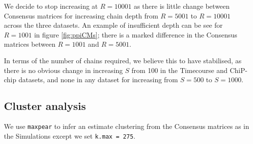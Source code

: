 \documentclass[]{article}
\begin{document}

We decide to stop increasing at $R=10001$ as there is little change between Consensus matrices for increasing chain depth from $R=5001$ to $R=10001$ across the three datasets. An example of insufficient depth can be see for $R=1001$ in figure \ref{fig:ppiCMs}; there is a marked difference in the Consensus matrices between $R=1001$ and $R=5001$. 

In terms of the number of chains required, we believe this to have stabilised, as there is no obvious change in increasing $S$ from 100 in the Timecourse and ChiP-chip datasets, and none in any dataset for increasing from $S=500$ to $S=1000$.

\subsection{Cluster analysis}
We use \texttt{maxpear} to infer an estimate clustering from the Consensus matrices as in the Simulations except we set \texttt{k.max = 275}. 


\end{document}
